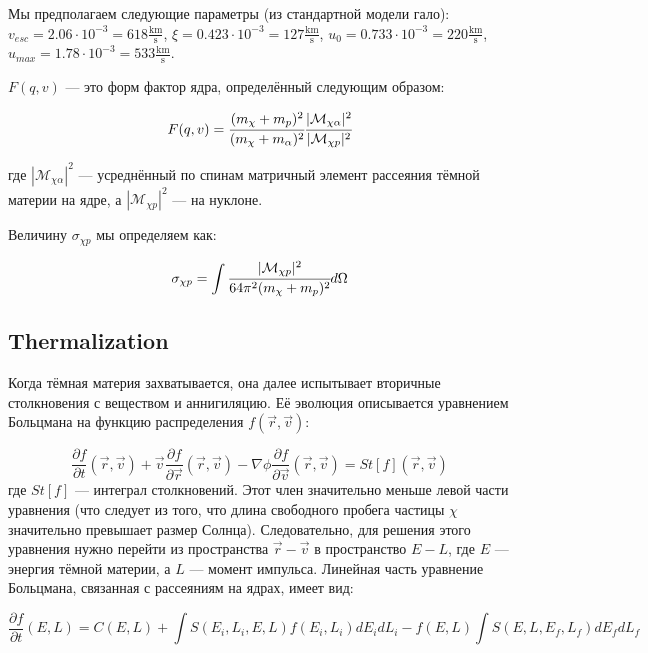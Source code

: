 \documentclass[a4paper, 14pt]{article}
\newcommand{\deriv}[2]{\frac{\partial #1}{\partial #2}}
\begin{document}
Мы предполагаем следующие параметры (из стандартной модели гало):
$v_{esc} = 2.06 \cdot 10^{-3} = 618 \frac{\text{km}}{\text{s}}$, $\xi = 0.423 \cdot 10^{-3} = 127 \frac{\text{km}}{\text{s}}$, $u_0 = 0.733 \cdot 10^{-3} = 220 \frac{\text{km}}{\text{s}}$, $u_{max} = 1.78 \cdot 10^{-3} = 533 \frac{\text{km}}{\text{s}}$.

$F(q,v)$ --- это форм фактор ядра, определённый следующим образом:

\begin{equation}
	\label{eq::ff_def}
	F(q,v) = \cfrac{(m_{\chi} + m_{p})^2}{(m_{\chi} + m_{\alpha})^2}
	\cfrac{|\mathcal{M}_{\chi \alpha}|^2}
	{|\mathcal{M}_{\chi p}|^2}
\end{equation}

где $|\mathcal{M}_{\chi \alpha}|^2$ --- усреднённый по спинам матричный элемент рассеяния тёмной материи на ядре, а $|\mathcal{M}_{\chi p}|^2$ --- на нуклоне.

Величину $\sigma_{\chi p}$ мы определяем как:

\begin{equation}
	\label{eq:sigma_def}
	\sigma_{\chi p} = \int {\cfrac{|\mathcal{M}_{\chi p}|^2}{64\pi^2 (m_{\chi} + m_p)^2} d\Omega}
\end{equation}




	\subsection{Thermalization}
	Когда тёмная материя захватывается, она далее испытывает вторичные столкновения с веществом и аннигиляцию. Её эволюция описывается уравнением Больцмана на функцию распределения $f(\vec{r},\vec{v})$:

\begin{equation}
	\label{eq:Boltsman}
	\deriv{f}{t}(\vec{r},\vec{v}) + \vec{v} \deriv{f}{\vec{r}}(\vec{r},\vec{v}) - \nabla \phi \deriv{f}{\vec{v}}(\vec{r},\vec{v}) = 
	St[f] (\vec{r},\vec{v})
\end{equation} 
где $St[f]$ --- интеграл столкновений. Этот член значительно меньше левой части уравнения (что следует из того, что длина свободного пробега частицы $\chi$ значительно превышает размер Солнца). Следовательно, для решения этого уравнения нужно перейти из пространства $\vec{r}-\vec{v}$ в пространство $E-L$, где $E$ --- энергия тёмной материи, а $L$ --- момент импульса. Линейная часть уравнение Больцмана, связанная с рассеяниям на ядрах, имеет вид:

\begin{equation}
	\label{eq:BoltsmanEL}
	\deriv{f}{t}(E,L) = C(E,L) + \int{ S(E_i,L_i,E,L) f(E_i,L_i) dE_idL_i } 
	-f(E,L) \int{ S(E,L,E_f,L_f)  dE_fdL_f }
\end{equation}
\end{document}
